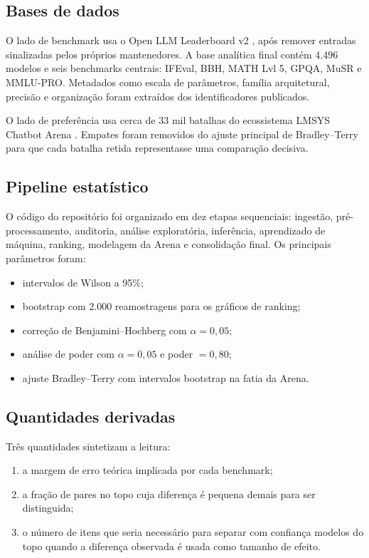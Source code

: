 \documentclass[11pt,a4paper]{article}
\begin{document}
\subsection{Bases de dados}
O lado de benchmark usa o Open LLM Leaderboard v2 \citep{huggingface2024leaderboard}, após remover entradas sinalizadas pelos próprios mantenedores. A base analítica final contém 4.496 modelos e seis benchmarks centrais: IFEval, BBH, MATH Lvl 5, GPQA, MuSR e MMLU-PRO. Metadados como escala de parâmetros, família arquitetural, precisão e organização foram extraídos dos identificadores publicados.

O lado de preferência usa cerca de 33 mil batalhas do ecossistema LMSYS Chatbot Arena \citep{zheng2023arena,arena2026}. Empates foram removidos do ajuste principal de Bradley--Terry para que cada batalha retida representasse uma comparação decisiva.

\subsection{Pipeline estatístico}
O código do repositório foi organizado em dez etapas sequenciais: ingestão, pré-processamento, auditoria, análise exploratória, inferência, aprendizado de máquina, ranking, modelagem da Arena e consolidação final. Os principais parâmetros foram:
\begin{itemize}
    \item intervalos de Wilson a 95\%;
    \item bootstrap com 2.000 reamostragens para os gráficos de ranking;
    \item correção de Benjamini--Hochberg com \(\alpha = 0{,}05\);
    \item análise de poder com \(\alpha = 0{,}05\) e poder \(= 0{,}80\);
    \item ajuste Bradley--Terry com intervalos bootstrap na fatia da Arena.
\end{itemize}

\subsection{Quantidades derivadas}
Três quantidades sintetizam a leitura:
\begin{enumerate}
    \item a margem de erro teórica implicada por cada benchmark;
    \item a fração de pares no topo cuja diferença é pequena demais para ser distinguida;
    \item o número de itens que seria necessário para separar com confiança modelos do topo quando a diferença observada é usada como tamanho de efeito.
\end{enumerate}
\end{document}
